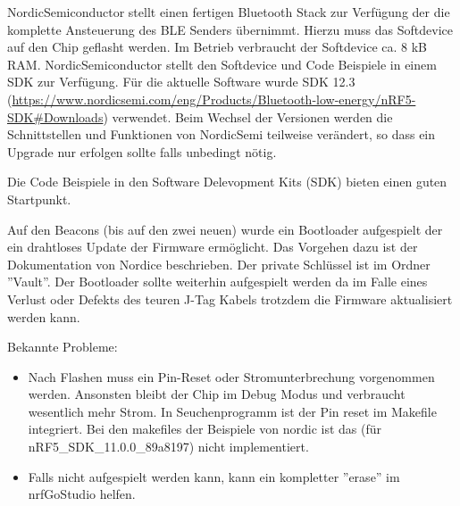 \documentclass[11pt,ngerman]{scrartcl} %
\begin{document}
NordicSemiconductor stellt einen fertigen Bluetooth Stack zur Verfügung der die komplette Ansteuerung des BLE Senders übernimmt. Hierzu muss das Softdevice auf den Chip geflasht werden. Im Betrieb verbraucht der Softdevice ca. 8 kB RAM.
NordicSemiconductor stellt den Softdevice und Code Beispiele in einem SDK zur Verfügung. Für die aktuelle Software wurde SDK 12.3 (\url{https://www.nordicsemi.com/eng/Products/Bluetooth-low-energy/nRF5-SDK\#Downloads}) verwendet. Beim Wechsel der Versionen werden die Schnittstellen und Funktionen von NordicSemi teilweise verändert, so dass ein Upgrade nur erfolgen sollte falls unbedingt nötig.

Die Code Beispiele in den Software Delevopment Kits (SDK) bieten einen guten Startpunkt. 

Auf den Beacons (bis auf den zwei neuen) wurde ein Bootloader aufgespielt der ein drahtloses Update der Firmware ermöglicht. Das Vorgehen dazu ist der Dokumentation von Nordice beschrieben. Der private Schlüssel ist im Ordner ''Vault''. Der Bootloader sollte weiterhin aufgespielt werden da im Falle eines Verlust oder Defekts des teuren J-Tag Kabels trotzdem die Firmware aktualisiert werden kann.


Bekannte Probleme:
\begin{itemize}
\item  Nach Flashen muss ein Pin-Reset oder Stromunterbrechung vorgenommen werden. Ansonsten bleibt der Chip im Debug Modus und verbraucht wesentlich mehr Strom.  In Seuchenprogramm ist der Pin reset im Makefile integriert. Bei den makefiles der Beispiele von nordic ist das (für nRF5\_SDK\_11.0.0\_89a8197) nicht implementiert.
\item Falls nicht aufgespielt werden kann, kann ein kompletter ''erase'' im nrfGoStudio helfen.
\end{itemize}
\end{document}
